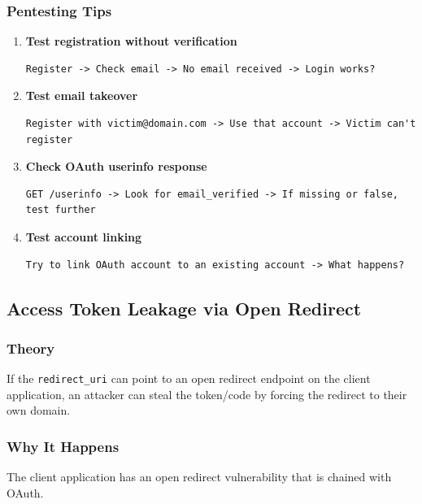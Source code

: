 \documentclass[12pt,a4paper]{article}
\begin{document}
\subsubsection{Pentesting Tips}
\begin{enumerate}
    \item \textbf{Test registration without verification}
    \begin{lstlisting}
Register -> Check email -> No email received -> Login works?
    \end{lstlisting}
    
    \item \textbf{Test email takeover}
    \begin{lstlisting}
Register with victim@domain.com -> Use that account -> Victim can't register
    \end{lstlisting}
    
    \item \textbf{Check OAuth userinfo response}
    \begin{lstlisting}
GET /userinfo -> Look for email_verified -> If missing or false, test further
    \end{lstlisting}
    
    \item \textbf{Test account linking}
    \begin{lstlisting}
Try to link OAuth account to an existing account -> What happens?
    \end{lstlisting}
\end{enumerate}


\subsection{Access Token Leakage via Open Redirect}
\subsubsection{Theory}
If the \texttt{redirect\_uri} can point to an open redirect endpoint on the client application, an attacker can steal the token/code by forcing the redirect to their own domain.

\subsubsection{Why It Happens}
The client application has an open redirect vulnerability that is chained with OAuth.
\end{document}
